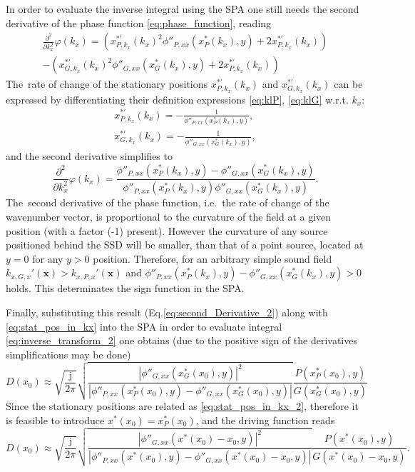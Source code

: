 \documentclass[12pt,a4paper]{article}
\newcommand{\ti}{\mathrm{j}}
\newcommand{\vx}{\mathbf{x}}
\begin{document}
In order to evaluate the inverse integral using the SPA one still needs the second derivative of the phase function \eqref{eq:phase_function}, reading
\begin{multline}
\frac{\partial^2}{\partial k_x^2} \varphi(k_x) = 
 \left( x^{*'}_{P,k_x}(k_x)^2 \phi''_{P,xx}(x^*_P (k_x),y)  + 2 x^{*'}_{P,k_x}(k_x)\right) 
\\
-\left( x^{*'}_{G,k_x}(k_x)^2 \phi''_{G,xx}(x^*_G(k_x),y)  +  2 x^{*'}_{P,k_x}(k_x)\right) 
\label{eq:second_Derivative}
\end{multline}
The~rate of change of the stationary positions $ x^{*'}_{P,k_x}(k_x)$ and $ x^{*'}_{G,k_x}(k_x)$ can be expressed by differentiating their definition expressions \eqref{eq:klP}, \eqref{eq:klG} w.r.t. $k_x$:
\begin{eqnarray}
x^{*'}_{P,k_x}(k_x) = -\frac{1}{ \phi''_{P,xx}(x^*_P(k_x),y) }, \\
x^{*'}_{G,k_x}(k_x) = -\frac{1}{ \phi''_{G,xx}(x^*_G(k_x),y) }, 
\end{eqnarray}
and the second derivative simplifies to
\begin{equation}
\frac{\partial^2}{\partial k_x^2} \varphi(k_x) = \frac{ \phi''_{P,xx}(x^*_P(k_x),y) - \phi''_{G,xx}(x^*_G(k_x),y)}{\phi''_{P,xx}(x^*_P(k_x),y) \phi''_{G,xx}(x^*_G(k_x),y)}.
\label{eq:second_Derivative_2}
\end{equation}
The~second derivative of the phase function, i.e.\ the rate of change of the wavenumber vector, is proportional to the curvature of the field at a given position (with a factor (-1) present).
However the curvature of any source positioned behind the SSD will be smaller, than that of a point source, located at $y = 0$ for any $y>0$ position.
Therefore, for an arbitrary simple sound field $k_{x,G,x}'(\vx) > k_{x,P,x}'(\vx)$ and $\phi''_{P,xx}(x^*_P(k_x),y) - \phi''_{G,xx}(x^*_G(k_x),y) >0$ holds.
This determinates the sign function in the SPA.

Finally, substituting this result (Eq.\eqref{eq:second_Derivative_2}) along with \eqref{eq:stat_pos_in_kx} into the SPA in order to evaluate integral \eqref{eq:inverse_transform_2} one obtains (due to the positive sign of the derivatives simplifications may be done)
\begin{equation}
D(x_0) \approx
\sqrt{\frac{\ti}{2\pi}} 
\sqrt{\frac{ \left| \phi''_{G,xx}(x^*_G(x_0),y )\right|^2}{\left| \phi''_{P,xx}(x^*_P(x_0),y) - \phi''_{G,xx}(x^*_G(x_0),y)\right|}}
\frac{P(x^*_P(x_0),y)}{G(x^*_G(x_0),y)}
\end{equation}
Since the stationary positions are related as \eqref{eq:stat_pos_in_kx_2}, therefore it is feasible to introduce $x^*(x_0) = x^*_P(x_0)$, and the driving function reads
\begin{equation}
D(x_0) \approx
\sqrt{\frac{\ti}{2\pi}} 
\sqrt{\frac{ \left| \phi''_{G,xx}(x^*(x_0)-x_0,y )\right|^2}{\left| \phi''_{P,xx}(x^*(x_0),y) - \phi''_{G,xx}(x^*(x_0) - x_0,y)\right|}}
\frac{P(x^*(x_0),y)}{G(x^*(x_0) - x_0,y)}.
\label{eq:spatial_sdm}
\end{equation}
\end{document}
